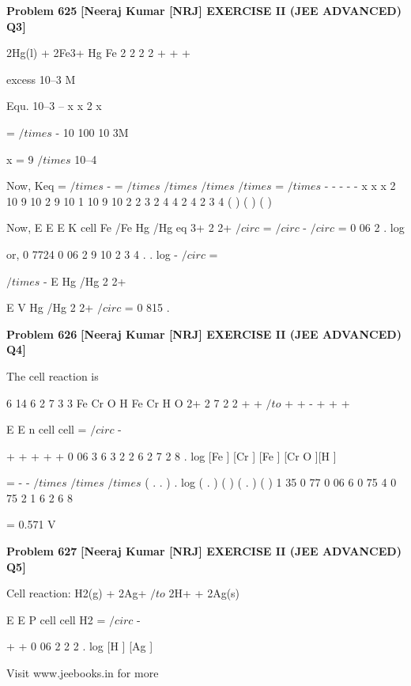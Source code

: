 \begin{problembox}
\textbf{Problem 625} \hfill \textbf{[Neeraj Kumar [NRJ] EXERCISE II (JEE ADVANCED) Q3]}
\label{q:ext-nrj_all_questions-625}

2Hg(l) + 2Fe3+             Hg
Fe
2
2
2
2
+
+
+
 
 
            excess    10--3 M
 
 Equ.                 10--3 -- x                x
2         x 
 
  
                  =
$/times$
-
10
100
10 3M 
 
   x = 9 $/times$ 10--4 
 
 Now, Keq =
$/times$
-
=
$/times$
$/times$
$/times$
$/times$
=
$/times$
-
-
-
-
-
x
x
x
2
10
9 10
2
9 10
1 10
9
10
2
2
3
2
4
4 2
4 2
3
4
(
)
(
)
(
)
 
 
 Now, E
E
E
K
cell
Fe
/Fe
Hg
/Hg
eq
3+
2
2+
$/circ$
=
$/circ$
-
$/circ$
= 0 06
2
.
log
 
 
 or, 0 7724
0 06
2
9
10
2
3
4
.
.
log
-
$/circ$
=
 
$/times$
-
E Hg
/Hg
2
2+
 
 
   E
V
Hg
/Hg
2
2+
$/circ$
= 0 815
.
\end{problembox}

\begin{problembox}
\textbf{Problem 626} \hfill \textbf{[Neeraj Kumar [NRJ] EXERCISE II (JEE ADVANCED) Q4]}
\label{q:ext-nrj_all_questions-626}

The cell reaction is 
 
 
6
14
6
2
7
3
3
Fe
Cr O
H
Fe
Cr
H O
2+
2
7
2
2
+
+
$/to$
+
+
-
+
+
+
 
 
 
E
E
n
cell
cell
=
$/circ$
-
 
+
+
+
+
+
0 06
3
6
3
2
2
6
2
7
2
8
.
log
[Fe
] [Cr
]
[Fe
] [Cr O
][H ]
 
 
         
=
-
-
$/times$
$/times$
$/times$
( .
.
)
.
log ( .
)
( )
( .
)
( )
1 35
0 77
0 06
6
0 75
4
0 75
2
1
6
2
6
8 
 
         = 0.571 V
\end{problembox}

\begin{problembox}
\textbf{Problem 627} \hfill \textbf{[Neeraj Kumar [NRJ] EXERCISE II (JEE ADVANCED) Q5]}
\label{q:ext-nrj_all_questions-627}

Cell reaction: H2(g) + 2Ag+ $/to$ 2H+ + 2Ag(s)
 
 
E
E
P
cell
cell
H2
=
$/circ$
-
 
+
+
0 06
2
2
2
.
log
[H ]
[Ag ]
 
 
 
Visit www.jeebooks.in for more
\end{problembox}

